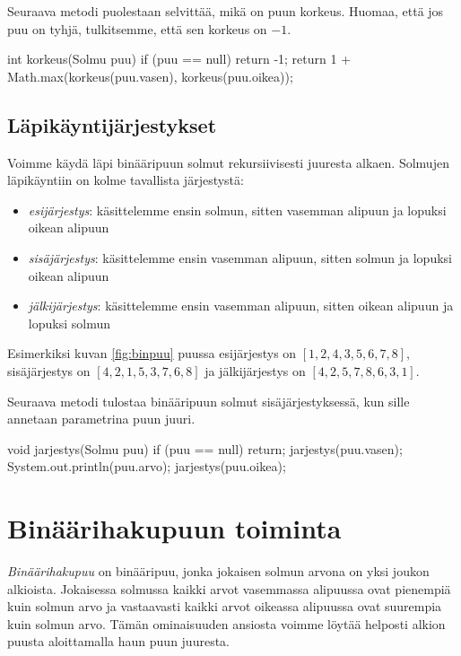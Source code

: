 Seuraava metodi puolestaan selvittää, mikä on puun korkeus.
Huomaa, että jos puu on tyhjä, tulkitsemme,
että sen korkeus on $-1$.

\begin{code}
int korkeus(Solmu puu) {
    if (puu == null) return -1;
    return 1 + Math.max(korkeus(puu.vasen), korkeus(puu.oikea));
}
\end{code}

\subsection{Läpikäyntijärjestykset}

Voimme käydä läpi binääripuun solmut rekursiivisesti
juuresta alkaen.
Solmujen läpikäyntiin on kolme tavallista järjestystä:

\begin{itemize}
\item \emph{esijärjestys}: käsittelemme ensin solmun, sitten vasemman alipuun
ja lopuksi oikean alipuun
\item \emph{sisäjärjestys}: käsittelemme ensin vasemman alipuun, sitten solmun
ja lopuksi oikean alipuun
\item \emph{jälkijärjestys}: käsittelemme ensin vasemman alipuun,
sitten oikean alipuun ja lopuksi solmun
\end{itemize}

Esimerkiksi kuvan \ref{fig:binpuu} puussa
esijärjestys on $[1,2,4,3,5,6,7,8]$,
sisäjärjes\-tys on $[4,2,1,5,3,7,6,8]$ ja
jälkijärjestys on $[4,2,5,7,8,6,3,1]$.

Seuraava metodi tulostaa binääripuun solmut
sisäjärjestyksessä, kun sille annetaan parametrina
puun juuri.

\begin{code}
void jarjestys(Solmu puu) {
    if (puu == null) return;
    jarjestys(puu.vasen);
    System.out.println(puu.arvo);
    jarjestys(puu.oikea);
}
\end{code}

\section{Binäärihakupuun toiminta}

\emph{Binäärihakupuu} on binääripuu, jonka jokaisen solmun
arvona on yksi joukon alkioista.
Jokaisessa solmussa
kaikki arvot vasemmassa alipuussa ovat pienempiä
kuin solmun arvo ja vastaavasti kaikki arvot 
oikeassa alipuussa ovat suurempia kuin solmun arvo.
Tämän ominaisuuden ansiosta voimme löytää helposti
alkion puusta aloittamalla haun puun juuresta.

